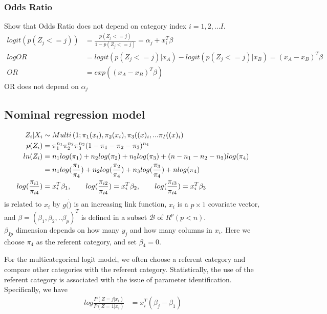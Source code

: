 \documentclass{article}
\begin{document}
\subsubsection{Odds Ratio}
Show that Odds Ratio does not depend on category index $i=1,2, ...I$. 
\begin{align*}
logit (p(Z_j <= j)) &= \frac{p(Z_j <= j)}{1-p(Z_j <= j)} = \alpha_j + x_i^T \beta \\
log OR &= logit (p(Z_j <= j)| x_A)- logit (p(Z_j <= j)| x_B) =( x_A-x_B)^T \beta\\
OR &= exp(( x_A-x_B)^T \beta)
\end{align*}
OR does not depend on $\alpha_j$



\subsection{Nominal regression model}
    \begin{align*}
 	Z_i| X_i & \sim Multi\left(1; \pi_1 (\mathnormal{x}_i), \pi_2(\mathnormal {x}_i), \pi_3(\mathnormal(x)_i,... \pi_I(\mathnormal(x)_i \right) \\
	p(Z_i) &= \pi_1^{n_1} \pi_2^{n_2} \pi_3^{n_3} (1-\pi_1 - \pi_2 - \pi_3)^{n_4}\\
	ln(Z_i) &= n_1 log(\pi_1) + n_2 log(\pi_2) + n_3 log (\pi_3) + (n- n_1 - n_2 - n_3)  log (\pi_4)\\
		& = n_1 log (\frac{\pi_1}{\pi_4}) + n_2 log (\frac{\pi_2}{\pi_4}) + n_3 log (\frac{\pi_3}{\pi_4}) + n log(\pi_4)\\
   	log (\frac{\pi_{i1}}{\pi_{i4}}) &= x_i^T \beta_1, \qquad log (\frac{\pi_{i2}}{\pi_{i4}}) = x_i^T \beta_2, \qquad log (\frac{\pi_{i3}}{\pi_{i4}}) = x_i^T \beta_3
   \end{align*}  
is related to $x_i$ by 
$g(\dot)$ is an increasing link function, $x_i$ is a $p \times 1$ covariate vector, and $\beta = (\beta_1, \beta_2,.. \beta_p)^T$ is defined in a subset $\mathcal{B}$ of $R^p (p<n)$. \\
$\beta_{Ip}$ dimension depends on how many $y_j$ and how many columns in $x_i$. Here we choose $\pi_4$ as the referent category, and set $\beta_4 = 0$. 

For the multicategorical logit model, we often choose a referent category and compare other categories with the referent category. Statistically, the use of the referent category is associated with the issue of parameter identification. Specifically, we have
\begin{align*}
    log \frac{P(Z=j|x_i)}{P(Z=1|x_i)} &= x_i^T(\beta_j-\beta_1)
\end{align*}
\end{document}
